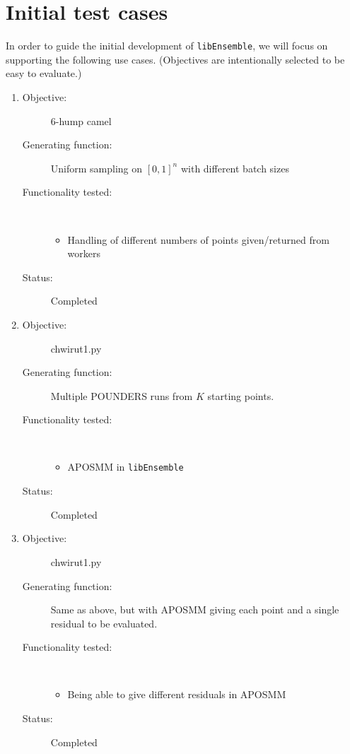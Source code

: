 \documentclass{article}
\newcommand{\libE}{\texttt{libEnsemble}\xspace}
\begin{document}
\section{Initial test cases}
In order to guide the initial development of \libE, we will focus on supporting the following use cases. (Objectives are intentionally selected to be easy to evaluate.)
\begin{enumerate}
  \item
    \begin{description}
      \item[Objective:] 6-hump camel
      \item[Generating function:] Uniform sampling on $[0,1]^n$ with different batch sizes
      \item[Functionality tested:] \
        \begin{itemize}
          \item Handling of different numbers of points given/returned from workers
        \end{itemize}
      \item[Status:] Completed
    \end{description}
    \bigskip
  \item
    \begin{description}
      \item[Objective:] chwirut1.py
      \item[Generating function:] Multiple POUNDERS runs from $K$ starting points.
      \item[Functionality tested:] \
        \begin{itemize}
          \item APOSMM in \libE
        \end{itemize}
      \item[Status:] Completed
    \end{description}
    \bigskip
  \item
    \begin{description}
      \item[Objective:] chwirut1.py
      \item[Generating function:] Same as above, but with APOSMM giving each point and a single residual to be evaluated.
      \item[Functionality tested:] \
        \begin{itemize}
          \item Being able to give different residuals in APOSMM
        \end{itemize}
      \item[Status:] Completed

\end{description}
\end{enumerate}
\end{document}
